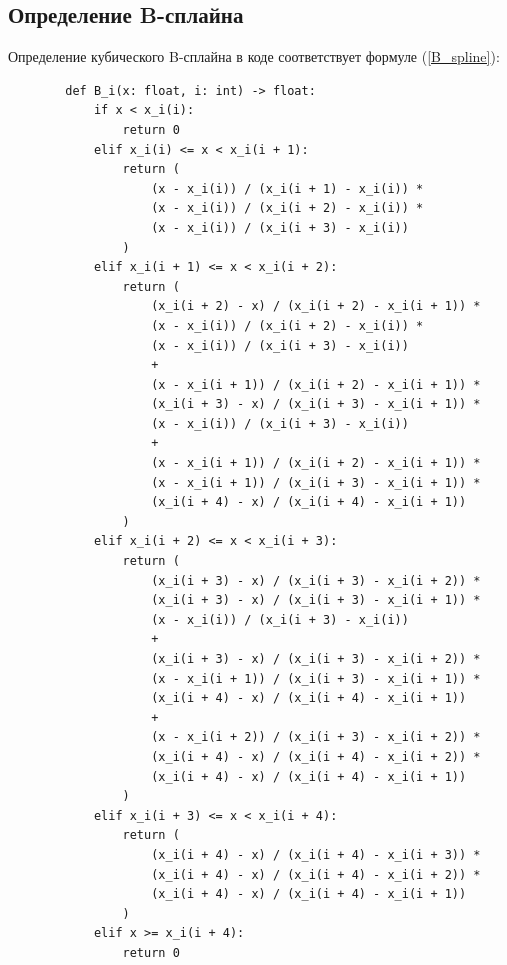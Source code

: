 \documentclass[a4paper,14pt]{extarticle}
\begin{document}
    \subsection{Определение B-сплайна}

    Определение кубического B-сплайна в коде соответствует формуле (\ref{B_spline}):
    \begin{verbatim}
        def B_i(x: float, i: int) -> float:
            if x < x_i(i):
                return 0
            elif x_i(i) <= x < x_i(i + 1):
                return (
                    (x - x_i(i)) / (x_i(i + 1) - x_i(i)) *
                    (x - x_i(i)) / (x_i(i + 2) - x_i(i)) * 
                    (x - x_i(i)) / (x_i(i + 3) - x_i(i))
                )
            elif x_i(i + 1) <= x < x_i(i + 2):
                return (
                    (x_i(i + 2) - x) / (x_i(i + 2) - x_i(i + 1)) *
                    (x - x_i(i)) / (x_i(i + 2) - x_i(i)) * 
                    (x - x_i(i)) / (x_i(i + 3) - x_i(i))
                    +
                    (x - x_i(i + 1)) / (x_i(i + 2) - x_i(i + 1)) *
                    (x_i(i + 3) - x) / (x_i(i + 3) - x_i(i + 1)) *
                    (x - x_i(i)) / (x_i(i + 3) - x_i(i))
                    +
                    (x - x_i(i + 1)) / (x_i(i + 2) - x_i(i + 1)) *
                    (x - x_i(i + 1)) / (x_i(i + 3) - x_i(i + 1)) *
                    (x_i(i + 4) - x) / (x_i(i + 4) - x_i(i + 1))
                )
            elif x_i(i + 2) <= x < x_i(i + 3):
                return (
                    (x_i(i + 3) - x) / (x_i(i + 3) - x_i(i + 2)) *
                    (x_i(i + 3) - x) / (x_i(i + 3) - x_i(i + 1)) *
                    (x - x_i(i)) / (x_i(i + 3) - x_i(i))
                    +
                    (x_i(i + 3) - x) / (x_i(i + 3) - x_i(i + 2)) *
                    (x - x_i(i + 1)) / (x_i(i + 3) - x_i(i + 1)) *
                    (x_i(i + 4) - x) / (x_i(i + 4) - x_i(i + 1))
                    +
                    (x - x_i(i + 2)) / (x_i(i + 3) - x_i(i + 2)) *
                    (x_i(i + 4) - x) / (x_i(i + 4) - x_i(i + 2)) *
                    (x_i(i + 4) - x) / (x_i(i + 4) - x_i(i + 1))
                )
            elif x_i(i + 3) <= x < x_i(i + 4):
                return (
                    (x_i(i + 4) - x) / (x_i(i + 4) - x_i(i + 3)) *
                    (x_i(i + 4) - x) / (x_i(i + 4) - x_i(i + 2)) *
                    (x_i(i + 4) - x) / (x_i(i + 4) - x_i(i + 1))
                )
            elif x >= x_i(i + 4):
                return 0
    \end{verbatim}
\end{document}
